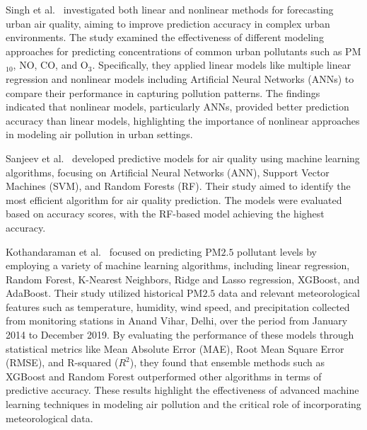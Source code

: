\documentclass[twoside,11pt]{article}
\begin{document}
Singh et al.\ \citep{SINGH2012244} investigated both linear and nonlinear methods for forecasting urban air quality, aiming to improve prediction accuracy in complex urban environments. The study examined the effectiveness of different modeling approaches for predicting concentrations of common urban pollutants such as PM$_{10}$, NO, CO, and O$_3$. Specifically, they applied linear models like multiple linear regression and nonlinear models including Artificial Neural Networks (ANNs) to compare their performance in capturing pollution patterns. The findings indicated that nonlinear models, particularly ANNs, provided better prediction accuracy than linear models, highlighting the importance of nonlinear approaches in modeling air pollution in urban settings.

Sanjeev et al.\ \citep{Sanjeev2021} developed predictive models for air quality using machine learning algorithms, focusing on Artificial Neural Networks (ANN), Support Vector Machines (SVM), and Random Forests (RF). Their study aimed to identify the most efficient algorithm for air quality prediction. The models were evaluated based on accuracy scores, with the RF-based model achieving the highest accuracy.

Kothandaraman et al.\ \citep{Kothandaraman2022Intelligent} focused on predicting PM${2.5}$ pollutant levels by employing a variety of machine learning algorithms, including linear regression, Random Forest, K-Nearest Neighbors, Ridge and Lasso regression, XGBoost, and AdaBoost. Their study utilized historical PM${2.5}$ data and relevant meteorological features such as temperature, humidity, wind speed, and precipitation collected from monitoring stations in Anand Vihar, Delhi, over the period from January 2014 to December 2019. By evaluating the performance of these models through statistical metrics like Mean Absolute Error (MAE), Root Mean Square Error (RMSE), and R-squared ($R^2$), they found that ensemble methods such as XGBoost and Random Forest outperformed other algorithms in terms of predictive accuracy. These results highlight the effectiveness of advanced machine learning techniques in modeling air pollution and the critical role of incorporating meteorological data.
\end{document}
